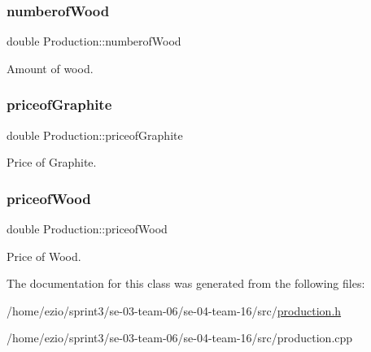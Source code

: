 \subsubsection{\texorpdfstring{numberof\+Wood}{numberofWood}}
{\footnotesize\ttfamily double Production\+::numberof\+Wood}

Amount of wood. \mbox{\label{classProduction_afca6aca1df88921b60bb7190adab5d51}} 
\subsubsection{\texorpdfstring{priceof\+Graphite}{priceofGraphite}}
{\footnotesize\ttfamily double Production\+::priceof\+Graphite}

Price of Graphite. \mbox{\label{classProduction_ac6bc16863f128802bebbb52263d5558c}} 
\subsubsection{\texorpdfstring{priceof\+Wood}{priceofWood}}
{\footnotesize\ttfamily double Production\+::priceof\+Wood}

Price of Wood. 

The documentation for this class was generated from the following files\+:\begin{DoxyCompactItemize}
\item 
/home/ezio/sprint3/se-\/03-\/team-\/06/se-\/04-\/team-\/16/src/\hyperlink{production_8h}{production.\+h}\item 
/home/ezio/sprint3/se-\/03-\/team-\/06/se-\/04-\/team-\/16/src/production.\+cpp\end{DoxyCompactItemize}
